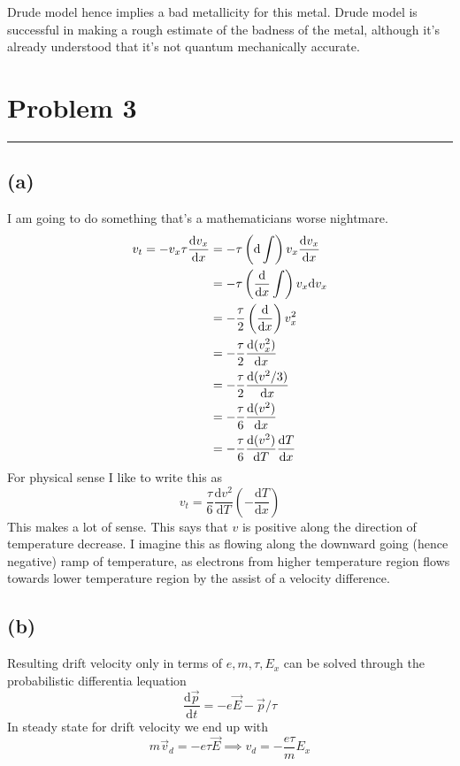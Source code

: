 \documentclass[letter, 10pts]{article}
\begin{document}
Drude model hence implies a bad metallicity for this metal. Drude model is successful in making a rough estimate of the badness of the metal, although it's already understood that it's not quantum mechanically accurate. 






\section*{Problem 3} 
\hrule
\subsection*{(a)} 
I am going to do something that's a mathematicians worse nightmare. 
\begin{align*}
v_t = - v_x \tau \frac{\mathrm{d} v_x}{\mathrm{d} x} &=   - \tau 
\left( \mathrm{d}  \int \right) v_x \frac{\mathrm{d} v_x}{\mathrm{d} x}\\ 
						     &= - \tau  \left( {\mathrm{d} \over \mathrm{d} x}  \int \right) v_x {\mathrm{d} v_x} \\
						     &					     = - \frac{\tau}{2} \left(\frac{\mathrm{d} }{\mathrm{d} x}\right) v_x^2 \\ 
						     &= - \frac{\tau}{2} \frac{\mathrm{d} (v_x^2)}{\mathrm{d} x} \\ 
						     &= - \frac{\tau}{2} \frac{\mathrm{d} (v^2 / 3)}{\mathrm{d} x} \\ 
						     &= - \frac{\tau}{6} \frac{\mathrm{d} (v^2 )}{\mathrm{d} x} \\ 
						     &= - \frac{\tau}{6} \frac{\mathrm{d} (v^2 )}{\mathrm{d} T} \frac{\mathrm{d} T}{\mathrm{d} x} \\ 
\end{align*}
For physical sense I like to write this as 
\[
v_t = \frac{\tau}{6} \frac{\mathrm{d} v^2}{\mathrm{d} T} \left(- \frac{\mathrm{d} T}{\mathrm{d} x}\right)
\] 
This makes a lot of sense. This says that $v$ is positive along the direction of temperature decrease. I imagine this as flowing along the downward going (hence negative) ramp of temperature, as electrons from higher temperature region flows towards lower temperature region by the assist of a velocity difference.


\subsection*{(b)} 
Resulting drift velocity only in terms of $e, m, \tau , E_x$ can be solved through the probabilistic differentia lequation 
\[
\frac{\mathrm{d} \vec{p}}{\mathrm{d} t} = - e \vec{E} - \vec{p}/\tau
\] 
In steady state for drift velocity we end up with 
\[
m \vec{v}_d = - e \tau \vec{E}  \implies v_d = - \frac{e \tau}{m} {E}_x
\] 
\end{document}
